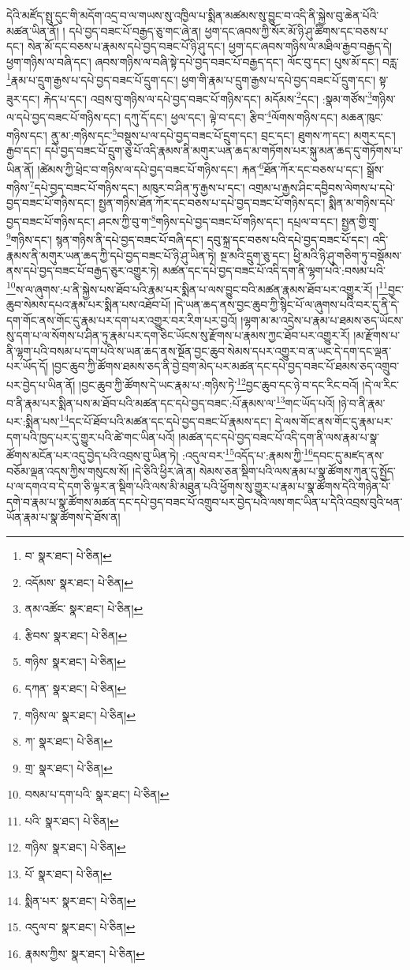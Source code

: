 དེའི་མཛོད་སྤུ་དུང་གི་མདོག་འདྲ་བ་ལ་གཡས་སུ་འཁྱིལ་པ་སྨིན་མཚམས་སུ་བྱུང་བ་འདི་ནི་སྐྱེས་བུ་ཆེན་པོའི་མཚན་ཡིན་ནོ། །
དཔེ་བྱད་བཟང་པོ་བརྒྱད་ཅུ་གང་ཞེ་ན། ཕྱག་དང་ཞབས་ཀྱི་སོར་མོ་ཉི་ཤུ་ཚིགས་དང་བཅས་པ་དང་། སེན་མོ་དང་བཅས་པ་རྣམས་དཔེ་བྱད་བཟང་པོ་ཉི་ཤུ་དང་། ཕྱག་དང་ཞབས་གཉིས་ལ་མཐིལ་རྒྱབ་བརྒྱད་དེ། ཕྱག་གཉིས་ལ་བཞི་དང་། ཞབས་གཉིས་ལ་བཞི་སྟེ་དཔེ་བྱད་བཟང་པོ་བརྒྱད་དང་། ལོང་བུ་དང་། པུས་མོ་དང་། བརླ་\footnote{བ་  སྣར་ཐང་།  པེ་ཅིན། }རྣམ་པ་དྲུག་རྒྱས་པ་དཔེ་བྱད་བཟང་པོ་དྲུག་དང་། ཕྱག་གི་རྣམ་པ་དྲུག་རྒྱས་པ་དཔེ་བྱད་བཟང་པོ་དྲུག་དང་། སྟ་ཟུར་དང་། རྐེད་པ་དང་། འབྲས་བུ་གཉིས་ལ་དཔེ་བྱད་བཟང་པོ་གཉིས་དང་། མདོམས་\footnote{འདོམས་  སྣར་ཐང་།  པེ་ཅིན། }དང་། :སྣམ་གཙོས་\footnote{ནམ་འཚོང་  སྣར་ཐང་།  པེ་ཅིན། }གཉིས་ལ་དཔེ་བྱད་བཟང་པོ་གཉིས་དང་། དཀུ་དོ་དང་། ཕྱལ་དང་། ལྟེ་བ་དང་། རྩིབ་\footnote{རྩིབས་  སྣར་ཐང་།  པེ་ཅིན། }ལོགས་གཉིས་དང་། མཆན་ཁུང་གཉིས་དང་། ནུ་མ་:གཉིས་དང་\footnote{གཉིས་  སྣར་ཐང་།  པེ་ཅིན། }བསྡུས་པ་ལ་དཔེ་བྱད་བཟང་པོ་དྲུག་དང་། བྲང་དང་། ཐུགས་ཀ་དང་། མགུར་དང་། རྒྱབ་དང་། དཔེ་བྱད་བཟང་པོ་དྲུག་ཅུ་པོ་འདི་རྣམས་ནི་མགུར་ཡན་ཆད་མ་གཏོགས་པར་སྐུ་མན་ཆད་དུ་གཏོགས་པ་ཡིན་ནོ། །ཚེམས་ཀྱི་ཕྲེང་བ་གཉིས་ལ་དཔེ་བྱད་བཟང་པོ་གཉིས་དང་། རྐན་\footnote{དཀན་  སྣར་ཐང་།  པེ་ཅིན། }ཐོན་ཀོར་དང་བཅས་པ་དང་། སྒྲོས་གཉིས་\footnote{གཉིས་ལ་  སྣར་ཐང་།  པེ་ཅིན། }དཔེ་བྱད་བཟང་པོ་གཉིས་དང་། མཁུར་བ་ཤིན་ཏུ་རྒྱས་པ་དང་། འགྲམ་པ་རྒྱས་ཤིང་དབྱིབས་ལེགས་པ་དཔེ་བྱད་བཟང་པོ་གཉིས་དང་། སྤྱན་གཉིས་ཐོན་ཀོར་དང་བཅས་པ་དཔེ་བྱད་བཟང་པོ་གཉིས་དང་། སྨིན་མ་གཉིས་དཔེ་བྱད་བཟང་པོ་གཉིས་དང་། ཤངས་ཀྱི་བུ་ག་\footnote{ཀ་  སྣར་ཐང་།  པེ་ཅིན། }གཉིས་དཔེ་བྱད་བཟང་པོ་གཉིས་དང་། དཔྲལ་བ་དང་། སྤྱན་གྱི་གྲྭ་\footnote{གྲ་  སྣར་ཐང་།  པེ་ཅིན། }གཉིས་དང་། སྙན་གཉིས་ནི་དཔེ་བྱད་བཟང་པོ་བཞི་དང་། དབུ་སྐྲ་དང་བཅས་པའི་དཔེ་བྱད་བཟང་པོ་དང་། འདི་རྣམས་ནི་མགུར་ཡན་ཆད་ཀྱི་དཔེ་བྱད་བཟང་པོ་ཉི་ཤུ་ཡིན་ཏེ། སྔ་མའི་དྲུག་ཅུ་དང་། ཕྱི་མའི་ཉི་ཤུ་གཅིག་ཏུ་བསྡོམས་ནས་དཔེ་བྱད་བཟང་པོ་བརྒྱད་ཅུར་འགྱུར་ཏེ། མཚན་དང་དཔེ་བྱད་བཟང་པོ་འདི་དག་ནི་ལྷག་པའི་:བསམ་པའི་\footnote{བསམ་པ་དག་པའི་  སྣར་ཐང་།  པེ་ཅིན། }ས་ལ་ཞུགས་:པ་ནི་སྐྱེས་པས་ཐོབ་པའི་རྣམ་པར་སྨིན་པ་ལས་བྱུང་བའི་མཚན་རྣམས་ཐོབ་པར་འགྱུར་རོ། །\footnote{པའི་  སྣར་ཐང་།  པེ་ཅིན། }བྱང་ཆུབ་སེམས་དཔའ་རྣམ་པར་སྨིན་པས་འཐོབ་པོ། །དེ་ཡན་ཆད་ནས་བྱང་ཆུབ་ཀྱི་སྙིང་པོ་ལ་ཞུགས་པའི་བར་དུ་ནི་དེ་དག་གོང་ནས་གོང་དུ་རྣམ་པར་དག་པར་འགྱུར་བར་རིག་པར་བྱའོ། །ལྷག་མ་མ་འདྲེས་པ་རྣམ་པ་ཐམས་ཅད་ཡོངས་སུ་དག་པ་ལ་སོགས་པ་ཤིན་ཏུ་རྣམ་པར་དག་ཅིང་ཡོངས་སུ་རྫོགས་པ་རྣམས་ཀྱང་ཐོབ་པར་འགྱུར་རོ། །མ་རྫོགས་པ་ནི་ལྷག་པའི་བསམ་པ་དག་པའི་ས་ཡན་ཆད་ནས་སྔོན་བྱང་ཆུབ་སེམས་དཔར་འགྱུར་བ་ན་ཡང་དེ་དག་དང་ལྡན་པར་ཡོད་དོ། །བྱང་ཆུབ་ཀྱི་ཚོགས་ཐམས་ཅད་ནི་བྱེ་བྲག་མེད་པར་མཚན་དང་དཔེ་བྱད་བཟང་པོ་ཐམས་ཅད་འགྲུབ་པར་བྱེད་པ་ཡིན་ནོ། །བྱང་ཆུབ་ཀྱི་ཚོགས་དེ་ཡང་རྣམ་པ་:གཉིས་ཏེ་\footnote{གཉིས་  སྣར་ཐང་།  པེ་ཅིན། }བྱང་ཆུབ་དང་ཉེ་བ་དང་རིང་བའོ། །དེ་ལ་རིང་བ་ནི་རྣམ་པར་སྨིན་པས་མ་ཐོབ་པའི་མཚན་དང་དཔེ་བྱད་བཟང་:པོ་རྣམས་ལ་\footnote{པོ་  སྣར་ཐང་།  པེ་ཅིན། }གང་ཡོད་པའོ། །ཉེ་བ་ནི་རྣམ་པར་:སྨིན་པས་\footnote{སྨིན་པར་  སྣར་ཐང་།  པེ་ཅིན། }དང་པོ་ཐོབ་པའི་མཚན་དང་དཔེ་བྱད་བཟང་པོ་རྣམས་དང་། དེ་ལས་གོང་ནས་གོང་དུ་རྣམ་པར་དག་པའི་ཁྱད་པར་དུ་གྱུར་པའི་ཚེ་གང་ཡིན་པའོ། །མཚན་དང་དཔེ་བྱད་བཟང་པོ་འདི་དག་ནི་ལས་རྣམ་པ་སྣ་ཚོགས་མངོན་པར་འདུ་བྱེད་པའི་འབྲས་བུ་ཡིན་ཏེ། :འདུལ་བར་\footnote{འདུལ་བ་  སྣར་ཐང་།  པེ་ཅིན། }འདོད་པ་:རྣམས་ཀྱི་\footnote{རྣམས་ཀྱིས་  སྣར་ཐང་།  པེ་ཅིན། }དབང་དུ་མཛད་ནས་བཅོམ་ལྡན་འདས་ཀྱིས་གསུངས་སོ། །དེ་ཅིའི་ཕྱིར་ཞེ་ན། སེམས་ཅན་སྡིག་པའི་ལས་རྣམ་པ་སྣ་ཚོགས་ཀུན་དུ་སྤྱོད་པ་ལ་དགའ་བ་དེ་དག་ཅི་ལྟར་ན་སྡིག་པའི་ལས་མི་མཐུན་པའི་ཕྱོགས་སུ་གྱུར་པ་རྣམ་པ་སྣ་ཚོགས་དེའི་གཉེན་པོ་དགེ་བ་རྣམ་པ་སྣ་ཚོགས་མཚན་དང་དཔེ་བྱད་བཟང་པོ་འགྲུབ་པར་བྱེད་པའི་ལས་གང་ཡིན་པ་དེའི་འབྲས་བུའི་ཕན་ཡོན་རྣམ་པ་སྣ་ཚོགས་དེ་ཐོས་ན། 